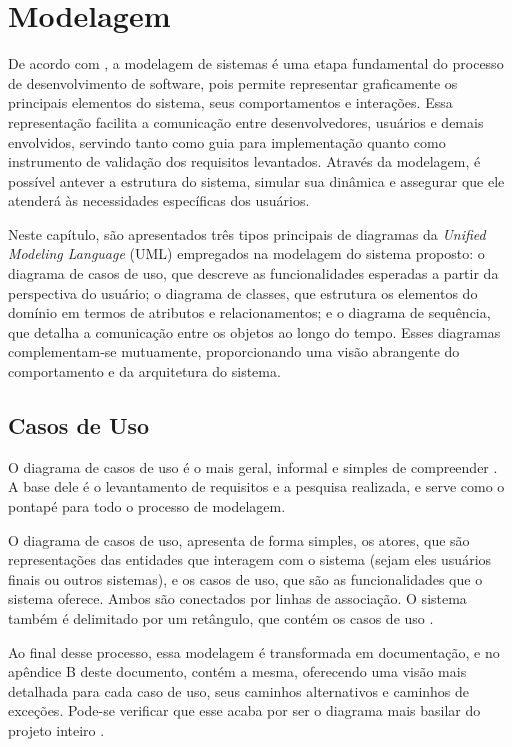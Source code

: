 \chapter{Modelagem}

De acordo com \cite{guedes:2022}, a modelagem de sistemas é uma etapa fundamental do
processo de desenvolvimento de software, pois permite representar graficamente
os principais elementos do sistema, seus comportamentos e interações. Essa
representação facilita a comunicação entre desenvolvedores, usuários e demais
envolvidos, servindo tanto como guia para implementação quanto como instrumento
de validação dos requisitos levantados. Através da modelagem, é possível
antever a estrutura do sistema, simular sua dinâmica e assegurar que ele
atenderá às necessidades específicas dos usuários.

Neste capítulo, são apresentados três tipos principais de diagramas da
\textit{Unified Modeling Language} (UML) empregados na modelagem do sistema
proposto: o diagrama de casos de uso, que descreve as funcionalidades esperadas
a partir da perspectiva do usuário; o diagrama de classes, que estrutura os
elementos do domínio em termos de atributos e relacionamentos; e o diagrama de
sequência, que detalha a comunicação entre os objetos ao longo do tempo. Esses
diagramas complementam-se mutuamente, proporcionando uma visão abrangente do
comportamento e da arquitetura do sistema.

\section{Casos de Uso}

O diagrama de casos de uso é o mais geral, informal e simples de compreender
\cite{guedes:2022}. A base dele é o levantamento de requisitos e a pesquisa
realizada, e serve como o pontapé para todo o processo de modelagem.

O diagrama de casos de uso, apresenta de forma simples, os atores, que são
representações das entidades que interagem com o sistema (sejam eles usuários
finais ou outros sistemas), e os casos de uso, que são as funcionalidades que o
sistema oferece. Ambos são conectados por linhas de associação. O sistema
também é delimitado por um retângulo, que contém os casos de uso
\cite{ibm:2021}.

Ao final desse processo, essa modelagem é transformada em documentação, e no
apêndice B deste documento, contém a mesma, oferecendo uma visão mais detalhada
para cada caso de uso, seus caminhos alternativos e caminhos de exceções.
Pode-se verificar que esse acaba por ser o diagrama mais basilar do projeto
inteiro \cite{guedes:2022}.

